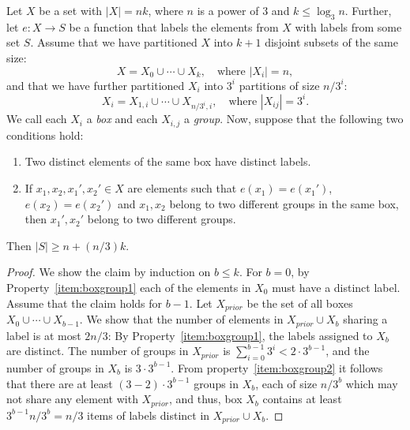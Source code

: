 \begin{lemma}\label{lemma:boxgroups}
Let $X$ be a set with $|X|=nk$, where $n$ is a power of $3$ and $k\leq \log_3 n$. Further, let $e\colon X\to S$ be a function that labels the elements from $X$ with labels from some set $S$. Assume that we have partitioned $X$ into $k+1$ disjoint subsets of the same size:
\[
X=X_0\cup\cdots \cup X_k, \quad \text{where $|X_i|=n$},
\]
and that we have further partitioned $X_i$ into  $3^i$  partitions of size $n/3^i$:
\[
X_i = X_{1,i}\cup\cdots\cup X_{n/3^i,i}, \quad \text{where $|X_{ij}|=3^i$.}
\]
We call each $X_i$ a \emph{box} and each $X_{i,j}$ a \emph{group}. Now, suppose that the following two conditions hold:
\begin{enumerate}[\normalfont (i)]
\item \label{item:boxgroup1} Two distinct elements of the same box have distinct labels.
\item \label{item:boxgroup2} If $x_1,x_2,x_1',x_2'\in X$ are elements such that $e(x_1)=e(x_1')$, $e(x_2)=e(x_2')$ and $x_1,x_2$ belong to two different groups in the same box, then $x_1',x_2'$ belong to two different groups.
\end{enumerate}
Then $|S|\geq n+(n/3)k$.
\end{lemma}
\begin{proof}
We show the claim by induction on $b \leq k$.
For $b=0$,  by Property~\eqref{item:boxgroup1}  each  of the elements in $X_0$ must have a  distinct label.
Assume that the claim holds for $b-1$.
Let $X_{prior}$ be the set of all boxes $X_0 \cup \cdots \cup X_{b-1}$.
We  show that the number of  elements in $X_{prior} \cup X_b$ sharing a label is at most $2n/3$:
 By Property~\eqref{item:boxgroup1},  the labels assigned to $X_b$ are distinct.
The number of groups in $X_{prior}$ is $\sum_{i=0}^{b-1} 3^i < 2 \cdot 3^{b-1}$, and the number of groups in $X_b$ is $3 \cdot 3^{b-1}$.
From property~\eqref{item:boxgroup2} it follows that there are at least $(3-2)\cdot 3^{b-1}$ groups in $X_b$, each of size $n/3^b$ which may not share any element with $X_{prior}$, and thus, box $X_b$ contains at least $3^{b-1} n/3^b = n/3$ items of labels distinct in $X_{prior}\cup X_b$. 
\end{proof}



